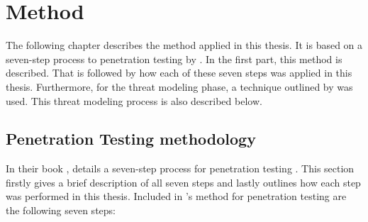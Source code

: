 \chapter{Method} \label{ch:method}
The following chapter describes the method applied in this thesis. It is based on a seven-step process to penetration testing by \textcite{weidman2014}. In the first part, this method is described. That is followed by how each of these seven steps was applied in this thesis. Furthermore, for the threat modeling phase, a technique outlined by \textcite{guzman2017iot} was used. This threat modeling process is also described below.

\section{Penetration Testing methodology} \label{ch:method:pentest}
In their book , \citeauthor{weidman2014} details a seven-step process for penetration testing \cite{weidman2014}. This section firstly gives a brief description of all seven steps and lastly outlines how each step was performed in this thesis. Included in \citeauthor{weidman2014}'s method for penetration testing are the following seven steps:

